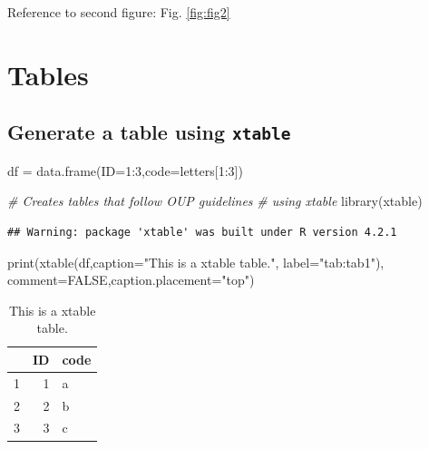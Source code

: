 \documentclass[webpdf,large,contemporary,namedate]{oup-authoring-template}
\newenvironment{Shaded}{\begin{snugshade}}{\end{snugshade}}
\newcommand{\AttributeTok}[1]{\textcolor[rgb]{0.77,0.63,0.00}{#1}}
\newcommand{\CommentTok}[1]{\textcolor[rgb]{0.56,0.35,0.01}{\textit{#1}}}
\newcommand{\ConstantTok}[1]{\textcolor[rgb]{0.00,0.00,0.00}{#1}}
\newcommand{\DecValTok}[1]{\textcolor[rgb]{0.00,0.00,0.81}{#1}}
\newcommand{\FunctionTok}[1]{\textcolor[rgb]{0.00,0.00,0.00}{#1}}
\newcommand{\NormalTok}[1]{#1}
\newcommand{\OtherTok}[1]{\textcolor[rgb]{0.56,0.35,0.01}{#1}}
\newcommand{\SpecialCharTok}[1]{\textcolor[rgb]{0.00,0.00,0.00}{#1}}
\newcommand{\StringTok}[1]{\textcolor[rgb]{0.31,0.60,0.02}{#1}}
\theoremstyle{thmstyleone}
\theoremstyle{thmstyletwo}
\theoremstyle{thmstylethree}
\begin{document}
Reference to second figure: Fig. \ref{fig:fig2}

\hypertarget{tables}{%
\section{Tables}\label{tables}}

\hypertarget{generate-a-table-using-xtable}{%
\subsection{\texorpdfstring{Generate a table using
\texttt{xtable}}{Generate a table using xtable}}\label{generate-a-table-using-xtable}}

\begin{Shaded}
\begin{Highlighting}[]
\NormalTok{df }\OtherTok{=} \FunctionTok{data.frame}\NormalTok{(}\AttributeTok{ID=}\DecValTok{1}\SpecialCharTok{:}\DecValTok{3}\NormalTok{,}\AttributeTok{code=}\NormalTok{letters[}\DecValTok{1}\SpecialCharTok{:}\DecValTok{3}\NormalTok{])}

\CommentTok{\# Creates tables that follow OUP guidelines }
\CommentTok{\# using xtable}
\FunctionTok{library}\NormalTok{(xtable) }
\end{Highlighting}
\end{Shaded}

\begin{verbatim}
## Warning: package 'xtable' was built under R version 4.2.1
\end{verbatim}

\begin{Shaded}
\begin{Highlighting}[]
\FunctionTok{print}\NormalTok{(}\FunctionTok{xtable}\NormalTok{(df,}\AttributeTok{caption=}\StringTok{"This is a xtable table."}\NormalTok{,}
             \AttributeTok{label=}\StringTok{"tab:tab1"}\NormalTok{),}
      \AttributeTok{comment=}\ConstantTok{FALSE}\NormalTok{,}\AttributeTok{caption.placement=}\StringTok{"top"}\NormalTok{)}
\end{Highlighting}
\end{Shaded}

\begin{table}[ht]
\centering
\caption{This is a xtable table.} 
\label{tab:tab1}
\begin{tabular}{rrl}
  \hline
 & ID & code \\ 
  \hline
1 &   1 & a \\ 
  2 &   2 & b \\ 
  3 &   3 & c \\ 
   \hline
\end{tabular}
\end{table}
\end{document}
